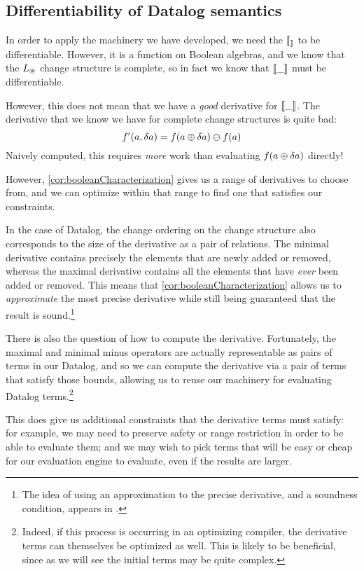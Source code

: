 \subsection{Differentiability of Datalog semantics}

In order to apply the machinery we have developed, we need the $\llbracket _ \rrbracket$ to
be differentiable. However, it is a function on Boolean algebras, and we know
that the $L_\circledast$ change structure is complete, so in fact we know that
$\llbracket \_ \rrbracket$ must be differentiable.

However, this does not mean that we have a \emph{good} derivative for
$\llbracket \_ \rrbracket$. The derivative that we know we have for complete change structures
is quite bad:
$$f'(a, \delta a) = f(a \oplus \delta a) \ominus f(a)$$
Naively computed, this requires \emph{more} work than evaluating $f(a \oplus \delta a)$ directly!

However, \ref{cor:booleanCharacterization} gives us a range of derivatives to
choose from, and we can optimize within that range to find one that satisfies
our constraints.

In the case of Datalog, the change ordering on the change structure also
corresponds to the size of the derivative as a pair of relations. The minimal
derivative contains precisely the elements that are newly added or removed,
whereas the maximal derivative contains all the elements that have \emph{ever}
been added or removed. This means that \ref{cor:booleanCharacterization} allows
us to \emph{approximate} the most precise derivative while still being
guaranteed that the result is sound.\footnote{The idea of using an approximation
to the precise derivative, and a soundness condition, appears in \cite{bancilhon1986amateur}.}

There is also the question of how to compute the derivative. Fortunately, the
maximal and minimal minus operators are actually representable as pairs of terms
in our Datalog, and so we can compute the derivative via a pair of terms that
satisfy those bounds, allowing us to reuse our machinery for evaluating Datalog
terms.\footnote{Indeed, if this process is occurring in an optimizing compiler,
  the derivative terms can themselves be optimized as well. This is likely to be
  beneficial, since as we will see the initial terms may be quite complex.}

This does give us additional constraints that the derivative terms must satisfy:
for example, we may need to preserve safety or range restriction in order to be
able to evaluate them; and we may wish to pick terms that will be easy or cheap
for our evaluation engine to evaluate, even if the results are larger.

